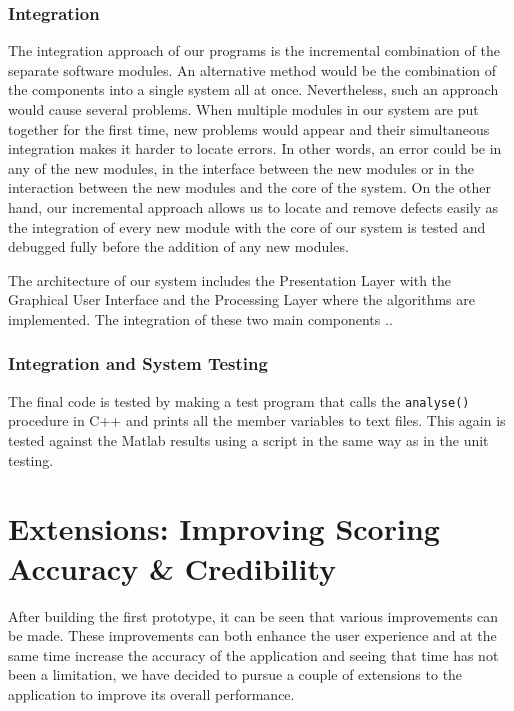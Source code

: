 \documentclass[10pt,a4paper]{article}
\begin{document}
\subsubsection{Integration}
\noindent
The integration approach of our programs is the incremental combination of the separate software modules. An alternative method would be the combination of the components into a single system all at once. Nevertheless, such an approach would cause several problems. When multiple modules in our system are put together for the first time, new problems would appear and their simultaneous integration makes it harder to locate errors. In other words, an error could be in any of the new modules, in the interface between the new modules or in the interaction between the new modules and the core of the system. On the other hand, our incremental approach allows us to locate and remove defects easily as the integration of every new module with the core of our system is tested and debugged fully before the addition of any new modules.
 
\noindent
The architecture of our system includes the Presentation Layer with the Graphical User Interface and the Processing Layer where the algorithms are implemented. The integration of these two main components ..


\subsubsection{Integration and System Testing}
The final code is tested by making a test program that calls the \texttt{analyse()} procedure in C++ and prints all the member variables to text files. This again is tested against the Matlab results using a script in the same way as in the unit testing.

\clearpage
\section{Extensions: Improving Scoring Accuracy \& Credibility}
\noindent
After building the first prototype, it can be seen that various improvements can be made. These improvements can both enhance the user experience and at the same time increase the accuracy of the application and seeing that time has not been a limitation, we have decided to pursue a couple of extensions to the application to improve its overall performance.
\end{document}
